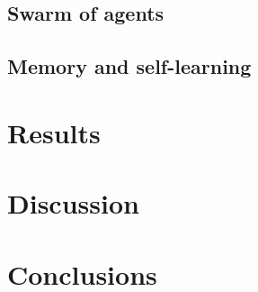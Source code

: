 \documentclass[11pt]{article}
\begin{document}
\subsection{Swarm of agents}
\subsection{Memory and self-learning}

\section{Results}

\section{Discussion}

\section{Conclusions}



\end{document}
